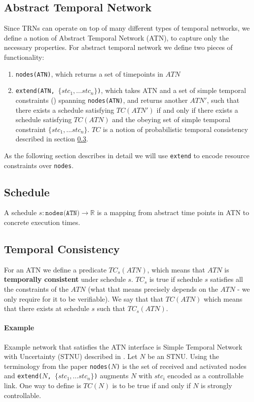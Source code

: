 \documentclass{article}
\begin{document}
\begin{multicols}{2}
\subsection{Abstract Temporal Network}
Since TRNs can operate on top of many different types of temporal networks, we define a notion of Abstract Temporal Network (ATN), to capture only the necessary properties. For abstract temporal network we define two pieces of functionality:
\begin{enumerate}
\item \texttt{nodes(ATN)}, which returns a set of timepoints in $ATN$
\item \texttt{extend(ATN, $\{ stc_1, ... stc_n \} $)}, which takes ATN and a set of simple temporal constraints (\cite{dechter1991temporal}) spanning \texttt{nodes(ATN)}, and returns another $ATN'$, such that there exists a schedule satisfying $TC(ATN')$ if and only if there exists a schedule satisfying $TC(ATN)$ and the obeying set of simple temporal constraint $\{ stc_1, ... stc_n \} $. $TC$ is a notion of probabilistic temporal consistency described in section \ref{temporal_consistency}.
\end{enumerate}
As the following section describes in detail we will use \texttt{extend} to encode resource constraints over \texttt{nodes}.
\subsection{Schedule}
A schedule $s: \texttt{nodes(ATN)} \rightarrow \mathbb{R}$ is a mapping from abstract time points in ATN to concrete execution times.
\subsection{Temporal Consistency}
\label{temporal_consistency}
For an ATN we define a predicate $TC_s(ATN)$, which means that $ATN$ is \textbf{temporally consistent} under schedule $s$. $TC_s$ is true if schedule $s$ satisfies all the constraints of the $ATN$ (what that means precisely depends on the $ATN$ - we only require for it to be verifiable). We say that that $TC(ATN)$ which means that there exists at schedule $s$ such that $TC_s(ATN)$.
\paragraph{Example}
Example network that satisfies the ATN interface is Simple Temporal Network with Uncertainty (STNU) described in \cite{vidal1996dealing}. Let $N$ be an STNU. Using the terminology from the paper \texttt{nodes($N$)} is the set of received and activated nodes and \texttt{extend($N$, $\{ stc_1, ... stc_n \} $)} augments $N$ with $stc_i$ encoded as a controllable link. One way to define is $TC(N)$ is to be true if and only if $N$ is strongly controllable.

\end{multicols}
\end{document}

